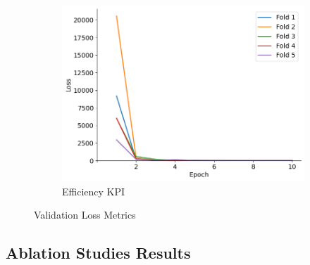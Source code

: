 \documentclass{report} %
\begin{document}
\begin{figure}[H]
\begin{subfigure}{0.32\textwidth}
        \centering
        \includegraphics[width=\textwidth]{./ReportImages/val_loss_y2.png}
        \caption{\centering Efficiency \ac{KPI}}
        \label{fig:Validation Loss for Efficiency grid}
    \end{subfigure}
    \caption{Validation Loss Metrics}
    \label{fig:Validation Loss Metrics}
\end{figure}

\subsection{Ablation Studies Results}
\label{subsec:Ablation Studies Results}
\end{document}
